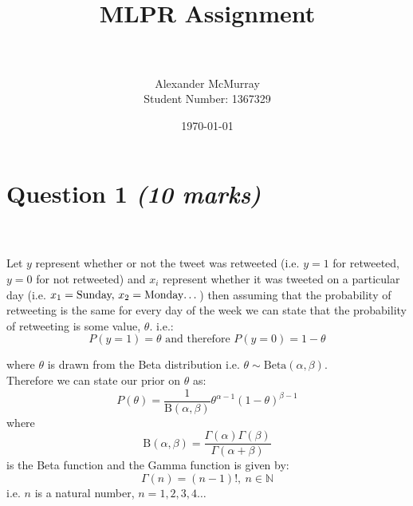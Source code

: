 \documentclass[paper=a4, fontsize=11pt]{scrartcl} %
\title{	
\normalfont \normalsize 
\horrule{0.5pt} \\[0.4cm] %
\huge {MLPR Assignment} \\ %
\horrule{2pt} \\[0.5cm] %
}
\author{Alexander McMurray\\
Student Number: 1367329} %
\date{\normalsize\today} %
\numberwithin{equation}{section} %
\numberwithin{figure}{section} %
\numberwithin{table}{section} %
\begin{document}
\maketitle %


\section{\textbf{Question 1 \textit{(10 marks)} }}

\\
\\

Let $y$ represent whether or not the tweet was retweeted (i.e. $y=1$ for retweeted, $y=0$ for not retweeted) and $x_i$ represent whether it was tweeted on a particular day (i.e. $x_1 = \textrm{Sunday, } x_2 = \textrm{Monday\dots}$) then assuming that the probability of retweeting is the same for every day of the week we can state that the probability of retweeting is some value, $\theta$. i.e.:
\begin{equation}
P(y=1)=\theta \textrm{ and therefore } P(y=0)=1-\theta
\end{equation}

where $\theta$ is drawn from the Beta distribution i.e. $\theta \sim \textrm{Beta}(\alpha, \beta)$.\\ 

Therefore we can state our prior on $\theta$ as:
\begin{equation}
P(\theta) = \frac{1}{\textrm{B}(\alpha,\beta)} \theta^{\alpha-1} (1-\theta)^{\beta-1}
\end{equation}
where 
\begin{equation}\textrm{B}(\alpha,\beta) = \frac{\Gamma(\alpha)\Gamma(\beta)}{\Gamma(\alpha + \beta)} \label{eq:betagamma}
\end{equation} is the Beta function and the Gamma function is given by:
\begin{equation}
\Gamma (n) = (n-1)!,~n\in \mathbb{N} \label{eq:gamma}
\end{equation} 
i.e. $n$ is a natural number, $n =1,2,3,4 \dots$\\ 
\end{document}
